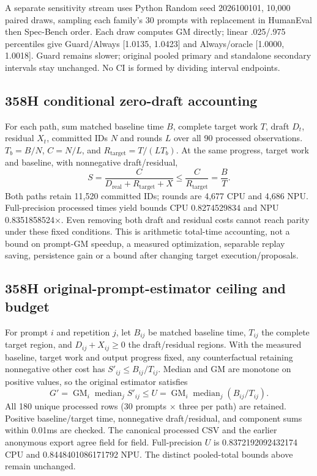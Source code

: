 A separate sensitivity stream uses Python Random seed 2026100101, 10,000 paired draws, sampling each family's 30 prompts with replacement in HumanEval then Spec-Bench order. Each draw computes GM directly; linear .025/.975 percentiles give Guard/Always [1.0135, 1.0423] and Always/oracle [1.0000, 1.0018]. Guard remains slower; original pooled primary and standalone secondary intervals stay unchanged. No CI is formed by dividing interval endpoints.

\subsection{358H conditional zero-draft accounting}
For each path, sum matched baseline time $B$, complete target work $T$, draft $D_t$, residual $X_t$, committed IDs $N$ and rounds $L$ over all 90 processed observations. $T_b=B/N$, $C=N/L$, and $R_{\mathrm{target}}=T/(LT_b)$. At the same progress, target work and baseline, with nonnegative draft/residual,
\[
S=\frac{C}{D_{\mathrm{real}}+R_{\mathrm{target}}+X}
\le\frac{C}{R_{\mathrm{target}}}=\frac{B}{T}.
\]
Both paths retain 11,520 committed IDs; rounds are 4,677 CPU and 4,686 NPU. Full-precision processed times yield bounds CPU 0.8274529834 and NPU 0.8351858524$\times$. Even removing both draft and residual costs cannot reach parity under these fixed conditions. This is arithmetic total-time accounting, not a bound on prompt-GM speedup, a measured optimization, separable replay saving, persistence gain or a bound after changing target execution/proposals.


\subsection{358H original-prompt-estimator ceiling and budget}
For prompt $i$ and repetition $j$, let $B_{ij}$ be matched baseline time, $T_{ij}$ the complete target region, and $D_{ij}+X_{ij}\ge0$ the draft/residual regions. With the measured baseline, target work and output progress fixed, any counterfactual retaining nonnegative other cost has $S'_{ij}\le B_{ij}/T_{ij}$. Median and GM are monotone on positive values, so the original estimator satisfies
\[
G'=\operatorname{GM}_i\operatorname{median}_j S'_{ij}
\le U=\operatorname{GM}_i\operatorname{median}_j(B_{ij}/T_{ij}).
\]
All 180 unique processed rows (30 prompts $\times$ three per path) are retained. Positive baseline/target time, nonnegative draft/residual, and component sums within 0.01ms are checked. The canonical processed CSV and the earlier anonymous export agree field for field. Full-precision $U$ is 0.8372192092432174 CPU and 0.8448401086171792 NPU. The distinct pooled-total bounds above remain unchanged.

